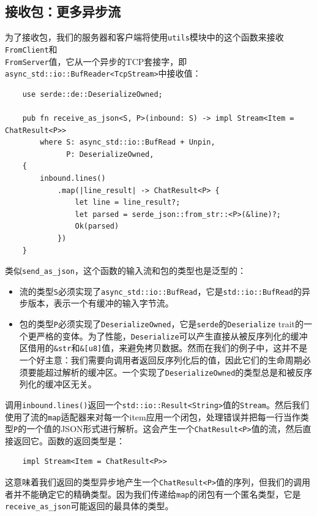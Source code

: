 \subsection{接收包：更多异步流}
为了接收包，我们的服务器和客户端将使用\texttt{utils}模块中的这个函数来接收\texttt{FromClient}和\\
\texttt{FromServer}值，它从一个异步的TCP套接字，即\texttt{async\_std::io::BufReader<TcpStream>}中接收值：
\begin{verbatim}
    use serde::de::DeserializeOwned;

    pub fn receive_as_json<S, P>(inbound: S) -> impl Stream<Item = ChatResult<P>>
        where S: async_std::io::BufRead + Unpin,
              P: DeserializeOwned,
    {
        inbound.lines()
            .map(|line_result| -> ChatResult<P> {
                let line = line_result?;
                let parsed = serde_json::from_str::<P>(&line)?;
                Ok(parsed)
            })
    }
\end{verbatim}

类似\texttt{send\_as\_json}，这个函数的输入流和包的类型也是泛型的：
\begin{itemize}
    \item 流的类型\texttt{S}必须实现了\texttt{async\_std::io::BufRead}，它是\texttt{std::io::BufRead}的异步版本，表示一个有缓冲的输入字节流。
    \item 包的类型\texttt{P}必须实现了\texttt{DeserializeOwned}，它是\texttt{serde}的\texttt{Deserialize} trait的一个更严格的变体。为了性能，\texttt{Deserialize}可以产生直接从被反序列化的缓冲区借用的\texttt{\&str}和\texttt{\&[u8]}值，来避免拷贝数据。然而在我们的例子中，这并不是一个好主意：我们需要向调用者返回反序列化后的值，因此它们的生命周期必须要能超过解析的缓冲区。一个实现了\texttt{DeserializeOwned}的类型总是和被反序列化的缓冲区无关。
\end{itemize}

调用\texttt{inbound.lines()}返回一个\texttt{std::io::Result<String>}值的\texttt{Stream}。然后我们使用了流的\texttt{map}适配器来对每一个item应用一个闭包，处理错误并把每一行当作类型\texttt{P}的一个值的JSON形式进行解析。这会产生一个\texttt{ChatResult<P>}值的流，然后直接返回它。函数的返回类型是：
\begin{verbatim}
    impl Stream<Item = ChatResult<P>>
\end{verbatim}

这意味着我们返回的类型异步地产生一个\texttt{ChatResult<P>}值的序列，但我们的调用者并不能确定它的精确类型。因为我们传递给\texttt{map}的闭包有一个匿名类型，它是\texttt{receive\_as\_json}可能返回的最具体的类型。

